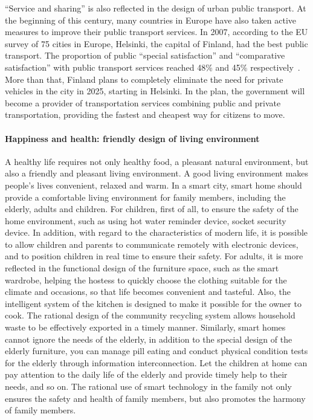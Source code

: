 \documentclass[letterpaper, twocolumn, 10pt, conference]{IEEEtran}
\begin{document}
\enquote{Service and sharing} is also reflected in the design of urban public transport. At the beginning of this century, many countries in Europe have also taken active measures to improve their public transport services. In 2007, according to the EU survey of 75 cities in Europe, Helsinki, the capital of Finland, had the best public transport. The proportion of public \enquote{special satisfaction} and \enquote{comparative satisfaction} with public transport services reached 48\% and 45\% respectively~\cite{zhao2007quality}. More than that, Finland plans to completely eliminate the need for private vehicles in the city in 2025, starting in Helsinki. In the plan, the government will become a provider of transportation services combining public and private transportation, providing the fastest and cheapest way for citizens to move.

\paragraph{Happiness and health: friendly design of living environment}

A healthy life requires not only healthy food, a pleasant natural environment, but also a friendly and pleasant living environment. A good living environment makes people's lives convenient, relaxed and warm. In a smart city, smart home should provide a comfortable living environment for family members, including the elderly, adults and children. For children, first of all, to ensure the safety of the home environment, such as using hot water reminder device, socket security device. In addition, with regard to the characteristics of modern life, it is possible to allow children and parents to communicate remotely with electronic devices, and to position children in real time to ensure their safety. For adults, it is more reflected in the functional design of the furniture space, such as the smart wardrobe, helping the hostess to quickly choose the clothing suitable for the climate and occasions, so that life becomes convenient and tasteful. Also, the intelligent system of the kitchen is designed to make it possible for the owner to cook. The rational design of the community recycling system allows household waste to be effectively exported in a timely manner. Similarly, smart homes cannot ignore the needs of the elderly, in addition to the special design of the elderly furniture, you can manage pill eating and conduct physical condition tests for the elderly through information interconnection. Let the children at home can pay attention to the daily life of the elderly and provide timely help to their needs, and so on. The rational use of smart technology in the family not only ensures the safety and health of family members, but also promotes the harmony of family members.
\end{document}
